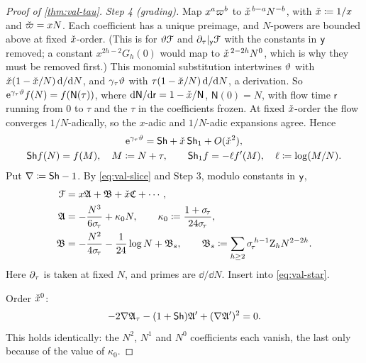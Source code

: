 \begin{proof}[Proof of \cref{thm:val-tau}]
\emph{Step 4 (grading).} Map $x^a\varpi^b$ to $\check{x}^{\,b-a}N^{-b}$, with $\check{x}\coloneqq1/x$ and $\check{\varpi}=xN$. Each coefficient has a unique preimage, and $N$-powers are bounded above at fixed $\check{x}$-order. (This is for $\vartheta\mathcal{F}$ and $\partial_\tau|_{\mathsf{y}}\mathcal{F}$ with the constants in $\mathsf{y}$ removed; a constant $x^{2h-2}G_h(0)$ would map to $\check{x}^{\,2-2h}N^0$, which is why they must be removed first.) This monomial substitution intertwines $\vartheta$ with $\check{x}(1-\check{x}/N)\,\mathrm{d}/\mathrm{d} N$, and $\gamma_\tau\vartheta$ with $\tau(1-\check{x}/N)\,\mathrm{d}/\mathrm{d} N$, a derivation. So $\mathrm{e}^{\gamma_\tau\vartheta}f(N)=f(\mathsf{N}(\tau))$, where $\mathrm{d}\mathsf{N}/\mathrm{d}\mathsf{r}=1-\check{x}/\mathsf{N}$, $\mathsf{N}(0)=N$, with flow time $\mathsf{r}$ running from $0$ to $\tau$ and the $\tau$ in the coefficients frozen. At fixed $\check{x}$-order the flow converges $1/N$-adically, so the $x$-adic and $1/N$-adic expansions agree. Hence
\begin{gather*}
\mathrm{e}^{\gamma_\tau\vartheta}=\mathsf{Sh}+\check{x}\,\mathsf{Sh}_1+O(\check{x}^2),\\
\mathsf{Sh} f(N)=f(M),\quad M\coloneqq N+\tau,\qquad\mathsf{Sh}_1f=-\ell f'(M),\quad\ell\coloneqq\log(M/N).
\end{gather*}
Put $\nabla\coloneqq\mathsf{Sh}-1$. By \eqref{eq:val-slice} and Step 3, modulo constants in $\mathsf{y}$,
\begin{align*}
\mathcal{F}&=x\mathfrak{A}+\mathfrak{B}+\check{x}\mathfrak{C}+\cdots,\\
\mathfrak{A}&=-\frac{N^3}{6\sigma_{\!\tau}}+\kappa_0N,\qquad\kappa_0\coloneqq\frac{1+\sigma_{\!\tau}}{24\sigma_{\!\tau}},\\
\mathfrak{B}&=-\frac{N^2}{4\sigma_{\!\tau}}-\frac{1}{24}\log N+\mathfrak{B}_s,\qquad\mathfrak{B}_s\coloneqq\sum_{h\geq 2}\sigma_{\!\tau}^{\,h-1}\mathrm{Z}_hN^{2-2h}.
\end{align*}
Here $\partial_\tau$ is taken at fixed $N$, and primes are $\dd/\dd N$. Insert into \eqref{eq:val-star}.

Order $\check{x}^0$:
\[
-2\nabla\mathfrak{A}_\tau-(1+\mathsf{Sh})\mathfrak{A}'+(\nabla\mathfrak{A}')^2=0.
\]
This holds identically: the $N^2$, $N^1$ and $N^0$ coefficients each vanish, the last only because of the value of $\kappa_0$.


\end{proof}
